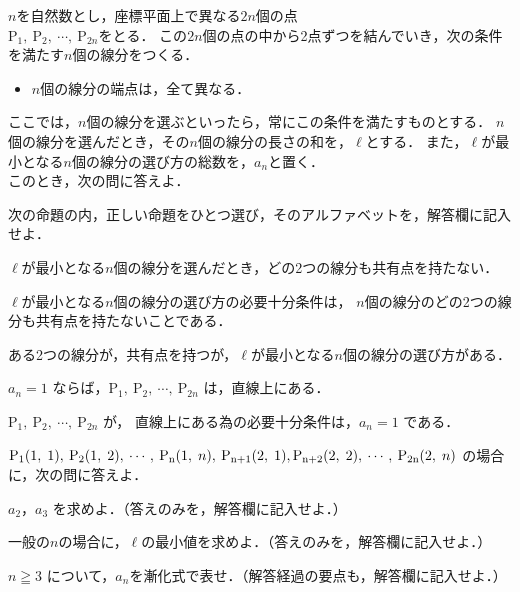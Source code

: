 \documentclass[../../../uem_mat_mei_q.tex]{subfiles}
\begin{document}
    $n$を自然数とし，座標平面上で異なる$2n$個の点\\
    $\mathrm{P}_1,\:\mathrm{P}_2,\:\cdots,\:\mathrm{P}_{2n}$をとる．%
    この$2n$個の点の中から2点ずつを結んでいき，次の条件を満たす$n$個の線分をつくる．
    
    \begin{itemize}[leftmargin=5\zw, labelsep=.7\zw, topsep=4pt]
        \item[（条件）] $n$個の線分の端点は，全て異なる．
    \end{itemize}
    ここでは，$n$個の線分を選ぶといったら，常にこの条件を満たすものとする．%
    $n$個の線分を選んだとき，その$n$個の線分の長さの和を，$\ell$とする．%
    また，$\ell$が最小となる$n$個の線分の選び方の総数を，$a_n$と置く．\\
    このとき，次の問に答えよ．

    \begin{myenuc}
        \item 次の命題の内，正しい命題をひとつ選び，そのアルファベットを，解答欄に記入せよ．
        
        \begin{myenua}[label=\Alph*., leftmargin=2\zw]
            \item $\ell$が最小となる$n$個の線分を選んだとき，どの2つの線分も共有点を持たない．
            \item $\ell$が最小となる$n$個の線分の選び方の必要十分条件は，%
                $n$個の線分のどの2つの線分も共有点を持たないことである．
            \item ある2つの線分が，共有点を持つが，$\ell$が最小となる$n$個の線分の選び方がある．
            \item $a_n=1$ ならば，$\mathrm{P}_1,\:\mathrm{P}_2,\:\cdots,\:\mathrm{P}_{2n}$ %
                は，直線上にある．
            \item $\mathrm{P}_1,\:\mathrm{P}_2,\:\cdots,\:\mathrm{P}_{2n}$ が，%
                直線上にある為の必要十分条件は，$a_n=1$ である．
        \end{myenua}
        \item $\mathrm{P_1}(1,\;1),\:\mathrm{P_2}(1,\;2),\:\cdots,\:\mathrm{P_n}(1,\;n),%
            \:\mathrm{P_{n+1}}(2,\;1),\\
            \mathrm{P_{n+2}}(2,\;2),%
            \:\cdots,\:\mathrm{P_{2n}}(2,\;n)$ の場合に，次の問に答えよ．
            \begin{myenud}
                \item $a_2$，$a_3$ を求めよ．（答えのみを，解答欄に記入せよ．）
                \item 一般の$n$の場合に，$\ell$の最小値を求めよ．（答えのみを，解答欄に記入せよ．）
                \item $n\geqq3$ について，$a_n$を漸化式で表せ．（解答経過の要点も，解答欄に記入せよ．）
            \end{myenud}
    \end{myenuc}
\end{document}
